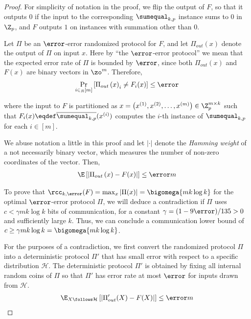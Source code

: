 %
%

	\begin{proof}%
		For simplicity of notation in the proof, we flip the output of $F$, so that it outputs $0$ if the input to the corresponding $\sumequal_{k,p}$ instance sums to $0$ in $\Z_p$, and $F$ outputs $1$ on instances with summation other than $0$.

		Let $\Pi$ be an $\error$-error randomized protocol for $F$, and let $\Pi_{out}\left(x\right)$ denote the output of $\Pi$ on input $x$.
		Here by ``the $\error$-error protocol'' we mean that the expected error rate of $\Pi$ is bounded by $\error$, since both $\Pi_{out}(x)$ and $F(x)$ are binary vectors in $\zo^m$.
		Therefore, 
		\begin{align*}
			\Pr_{i\in_R [m]}\left[\Pi_{out}\left(x\right)_i \ne F_i(x) \right]\le \error
		\end{align*}
		
		
		where the input to $F$ is partitioned as $x=\left(x^{(1)},x^{(2)},\dots,x^{(m)}\right)\in \Z_p^{m\times k}$ such that $F_i(x)\eqdef \overline{\sumequal_{k,p}}(x^{(i)})$ computes the $i$-th instance of $\sumequal_{k,p}$ for each $i\in [m]$.

		We abuse notation a little in this proof and let $|\cdot|$ denote the \emph{Hamming weight} of a not necessarily binary vector, 
		which measures the number of non-zero coordinates of the vector. Then, 
		\begin{align*}
		\E\left[ \left|\Pi_{out}\left(x\right) - F(x)\right| \right]\le \error m 
		\end{align*}

		To prove that $\rcc_{k,\error}(F) = \max_{x}|\Pi(x)|=\bigomega{m k\log k}$ for the optimal $\error$-error protocol $\Pi$,
		we will deduce a contradiction if $\Pi$ uses $c<\gamma m k\log k$ bits of communication,
		for a constant $\gamma=(1-9\error)/135>0$ and sufficiently large $k$.
		Thus, we can conclude a communication lower bound of $c\ge \gamma mk\log k= \bigomega{m k \log k}$.

		For the purposes of a contradiction, we first convert the randomized protocol $\Pi$ into a deterministic protocol $\Pi'$ that has small error with respect to a specific distribution $\mathcal{H}$. 
		The deterministic protocol $\Pi'$ is obtained by fixing all internal random coins of $\Pi$ so that $\Pi'$ has error rate at most $\error$ for inputs drawn from $\mathcal{H}$.
		\begin{align*}
			\E_{X\follows \mathcal{H}}\left[ \left| \Pi'_{out}(X) - F(X)\right| \right]\le \error m
		\end{align*}


\end{proof}
